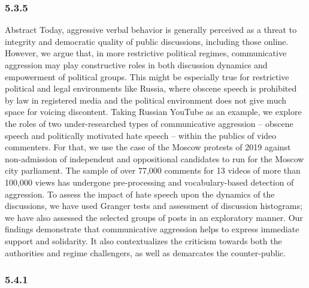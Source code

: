 \subsubsection{5.3.5}

Abstract Today, aggressive verbal behavior is generally perceived as a threat to integrity and democratic quality of public discussions, including those online. However, we argue that, in more restrictive political regimes, communicative aggression may play constructive roles in both discussion dynamics and empowerment of political groups. This might be especially true for restrictive political and legal environments like Russia, where obscene speech is prohibited by law in registered media and the political environment does not give much space for voicing discontent. Taking Russian YouTube as an example, we explore the roles of two under-researched types of communicative aggression -- obscene speech and politically motivated hate speech -- within the publics of video commenters. For that, we use the case of the Moscow protests of 2019 against non-admission of independent and oppositional candidates to run for the Moscow city parliament. The sample of over 77,000 comments for 13 videos of more than 100,000 views has undergone pre-processing and vocabulary-based detection of aggression. To assess the impact of hate speech upon the dynamics of the discussions, we have used Granger tests and assessment of discussion histograms; we have also assessed the selected groups of posts in an exploratory manner. Our findings demonstrate that communicative aggression helps to express immediate support and solidarity. It also contextualizes the criticism towards both the authorities and regime challengers, as well as demarcates the counter-public.

\subsubsection{5.4.1}

